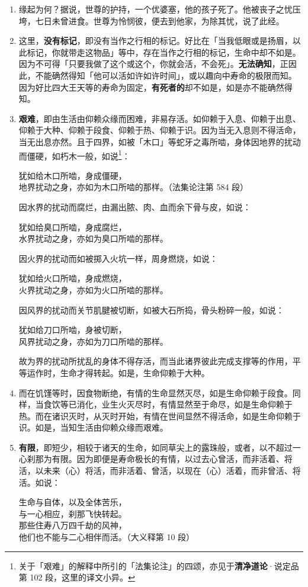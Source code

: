 \begin{enumerate}\item 缘起为何？据说，世尊的护持，一个优婆塞，他的孩子死了。他被丧子之忧压垮，七日未曾进食。世尊为怜悯彼，便去到他家，为除其忧，说了此经。
\item 这里，\textbf{没有标记}，即没有当作之行相的标记。好比在「当我低眼或是扬眉，以此标记，你就带走这物品」等中，存在当作之行相的标记，生命中却不如是。因为不可得「只要我做了这个或这个，你就会活，不会死」。\textbf{无法确知}，正因此，不能确然得知「他可以活如许如许时间」，或以趣向中寿命的极限而知。因为好比四大王天等的寿命为固定，\textbf{有死者的}却不如是，如是亦不能确然得知。
\item \textbf{艰难}，即由生活由仰赖众缘而困难，非易存活。如仰赖于入息、仰赖于出息、仰赖于大种、仰赖于段食、仰赖于热、仰赖于识。因为当无入息则不得活命，当无出息亦然。且于四界，如被「木口」等蛇牙之毒所啮，身体因地界的扰动而僵硬，如朽木一般，如说\footnote{关于「艰难」的解释中所引的「法集论注」的四颂，亦见于\textbf{清净道论}·说定品第 102 段，这里的译文小异。}：\begin{quoting}犹如给木口所啮，身成僵硬，\\地界扰动之身，亦如为木口所啮的那样。（法集论注第 584 段）\end{quoting}因水界的扰动而腐烂，由漏出脓、肉、血而余下骨与皮，如说：\begin{quoting}犹如给臭口所啮，身成腐烂，\\水界扰动之身，亦如为臭口所啮的那样。\end{quoting}因火界的扰动而如被掷入火坑一样，周身燃烧，如说：\begin{quoting}犹如给火口所啮，身成燃烧，\\火界扰动之身，亦如为火口所啮的那样。\end{quoting}因风界的扰动而关节肌腱被切断，如被大石所捣，骨头粉碎一般，如说：\begin{quoting}犹如给刀口所啮，身被切断，\\风界扰动之身，亦如为刀口所啮的那样。\end{quoting}故为界的扰动所扰乱的身体不得存活，而当此诸界彼此完成支撑等的作用，平等运作时，生命才得转起。如是，生命仰赖于大种。
\item 而在饥馑等时，因食物断绝，有情的生命显然灭尽，如是生命仰赖于段食。同样，当食饮等已消化，业生火灭尽时，有情显然至于命尽，如是生命仰赖于热。而在诸识灭时，从灭时开始，有情在世间显然不得活命，如是生命仰赖于识。如是，当知生活由仰赖众缘而艰难。
\item \textbf{有限}，即短少，相较于诸天的生命，如同草尖上的露珠般，或者，以不超过一心刹那为有限。因为即便是寿命极长的有情，以过去心曾活，而非活着、将活，以未来（心）将活，而非活着、曾活，以现在（心）活着，而非曾活、将活。如说：\begin{quoting}生命与自体，以及全体苦乐，\\与一心相应，刹那飞快转起。\\那些住寿八万四千劫的风神，\\他们也不能与二心相伴而活。（大义释第 10 段）\end{quoting}

\end{enumerate}
